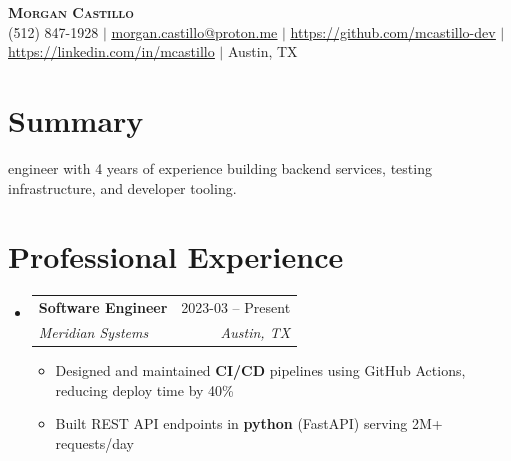 \documentclass[letterpaper,11pt]{article}
\makeatletter
\newcommand{\resumeItem}[1]{\item\small{{#1 \vspace{-2pt}}}}
\newcommand{\resumeSubheading}[4]{
  \vspace{-2pt}\item
    \begin{tabular*}{0.97\textwidth}[t]{l@{\extracolsep{\fill}}r}
      \textbf{#1} & #2 \\
      \textit{\small#3} & \textit{\small #4} \\
    \end{tabular*}\vspace{-7pt}
}
\newcommand{\resumeSubHeadingListStart}{\begin{itemize}[leftmargin=0.15in, label={}]}
\newcommand{\resumeSubHeadingListEnd}{\end{itemize}}
\newcommand{\resumeItemListStart}{\begin{itemize}}
\newcommand{\resumeItemListEnd}{\end{itemize}\vspace{-5pt}}
\makeatother
\begin{document}
\begin{center}
\textbf{\Huge \scshape Morgan Castillo} \\ \vspace{1pt}
\small (512) 847-1928 $|$ \href{mailto:morgan.castillo@proton.me}{\underline{morgan.castillo@proton.me}} $|$ \href{https://github.com/mcastillo-dev}{\underline{https://github.com/mcastillo-dev}} $|$ \href{https://linkedin.com/in/mcastillo}{\underline{https://linkedin.com/in/mcastillo}} $|$ Austin, TX
\end{center}


\section{Summary}
\smallSoftware engineer with 4 years of experience building backend services, testing infrastructure, and developer tooling.





\section{Professional Experience}
\resumeSubHeadingListStart


  \resumeSubheading

    {Software Engineer}{2023-03 -- Present}
    {Meridian Systems}{Austin, TX}

    \resumeItemListStart


      \resumeItem{Designed and maintained \textbf{CI/CD} pipelines using GitHub Actions, reducing deploy time by 40\%}


      \resumeItem{Built REST API endpoints in \textbf{python} (FastAPI) serving 2M+ requests/day}


    \resumeItemListEnd



\resumeSubHeadingListEnd
\end{document}
